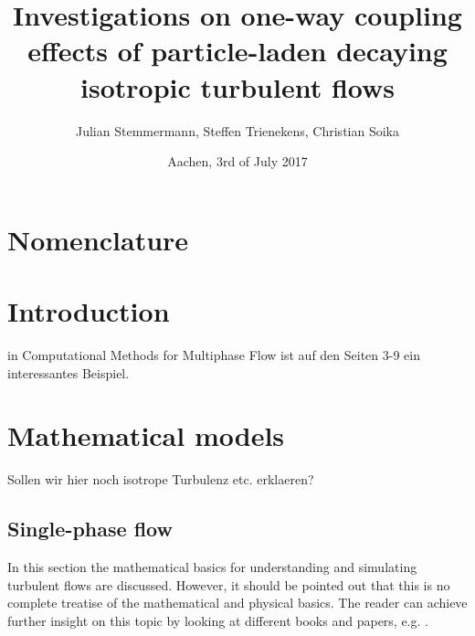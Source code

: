\documentclass[a4paper,10pt]{article}
\title{Investigations on one-way coupling effects of particle-laden decaying isotropic turbulent flows}
\author{Julian Stemmermann, Steffen Trienekens, Christian Soika}
\date{Aachen, 3rd of July 2017}
\numberwithin{equation}{section} %
\begin{document}
\maketitle

\pagebreak

\tableofcontents{} %
 
\pagebreak

\section{Nomenclature}
\printnomenclature
\pagebreak

\section{Introduction}
in Computational Methods for Multiphase Flow ist auf den Seiten 3-9 ein interessantes Beispiel.
\pagebreak
\section{Mathematical models}
Sollen wir hier noch isotrope Turbulenz etc. erklaeren?
\subsection{Single-phase flow} %
In this section the mathematical basics for understanding and simulating turbulent flows are discussed. However, it should be pointed out that this is no
complete treatise of the mathematical and physical basics. The reader can achieve further insight on this topic by looking at different books and papers, 
e.g. \cite{turbulentFlows}.
\newline
\end{document}
